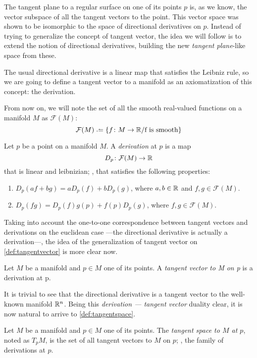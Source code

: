 The tangent plane to a regular surface on one of its points $p$ is, as we know, the vector subspace of all the tangent vectors to the point. This vector space was shown to be isomorphic to the space of directional derivatives on $p$. Instead of trying to generalize the concept of tangent vector, the idea we will follow is to extend the notion of directional derivatives, building the new \emph{tangent plane}-like space from these.

The usual directional derivative is a linear map that satisfies the Leibniz rule, so we are going to define a tangent vector to a manifold as an axiomatization of this concept: the derivation.

From now on, we will note the set of all the smooth real-valued functions on a manifold $M$ as $\mathcal{F}(M)$:
\[
\mathcal{F}(M) \defeq \{f \colon M \to \R / \textrm{f is smooth} \}
\]

\begin{definition}[Derivation]
	Let $p$ be a point on a manifold $M$. A \emph{derivation} at $p$ is a map
	\[
		D_p \colon \mathcal{F}(M) \to \mathbb{R}
	\]
	that is linear and leibnizian; \ie, that satisfies the following properties:
	\begin{enumerate}
		\item $D_p(af + bg) = aD_p(f) + bD_p(g)$, where $a,b \in \mathbb{R}$ and $f,g \in \mathcal{F}(M)$.
		\item $D_p(fg) = D_p(f)g(p) + f(p)D_p(g)$, where $f,g \in \mathcal{F}(M)$.
	\end{enumerate}
\end{definition}

Taking into account the one-to-one correspondence between tangent vectors and derivations on the euclidean case ---the directional derivative is actually a derivation---, the idea of the generalization of tangent vector on \autoref{def:tangentvector} is more clear now.

\begin{definition}
	\label{def:tangentvector}
	Let $M$ be a manifold and $p \in M$ one of its points. A \emph{tangent vector to M on p} is a derivation at p.
\end{definition}

It is trivial to see that the directional derivative is a tangent vector to the well-known manifold $\mathbb{R}^n$. Being this \emph{derivation --- tangent vector} duality clear, it is now natural to arrive to \autoref{def:tangentspace}.

\begin{definition}
	\label{def:tangentspace}
	Let $M$ be a manifold and $p \in M$ one of its points. The \emph{tangent space to $M$ at $p$}, noted as $T_p M$, is the set of all tangent vectors to $M$ on $p$; \ie, the family of derivations at $p$.
\end{definition}

